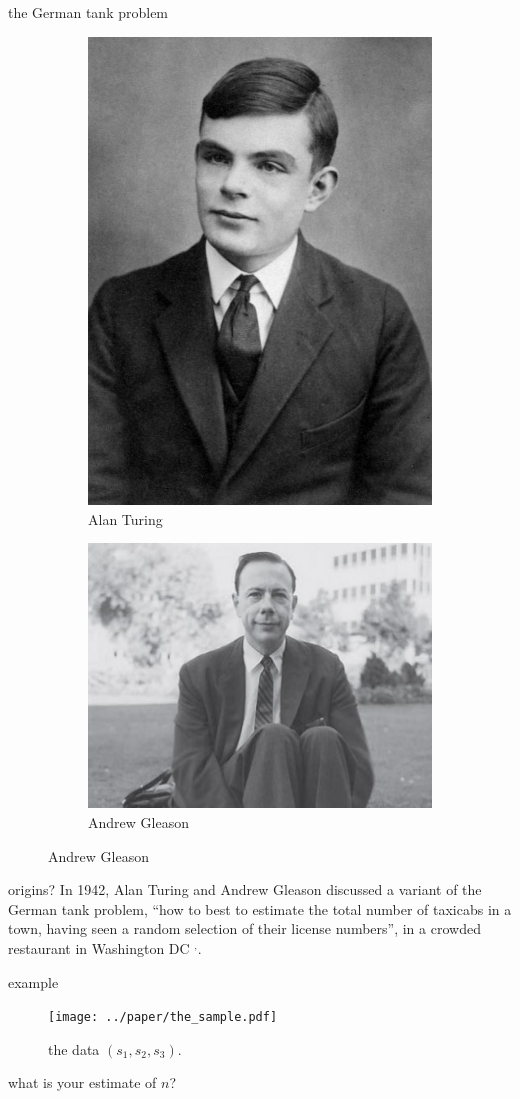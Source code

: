 \documentclass[10pt]{beamer}
\begin{document}
\begin{frame}[t]{the German tank problem}

\begin{figure}
	\centering
	\begin{subfigure}[b]{0.45\textwidth}
		\centering
		\includegraphics[height=0.5\textwidth]{turing.jpg} \caption{Alan Turing}
	\end{subfigure} 
	\begin{subfigure}[b]{0.45\textwidth}
		\centering
		\includegraphics[height=0.5\textwidth]{gleason.jpg}  \caption{Andrew Gleason}
	\end{subfigure} 
\end{figure}


\begin{exampleblock}{origins?}
In 1942, Alan Turing and Andrew Gleason discussed a variant of the German tank problem, ``how to best to estimate the total number of taxicabs in a town, having seen a random selection of their license numbers'', in a crowded restaurant in Washington DC $^,$. 
\end{exampleblock}
\end{frame}

\begin{frame}[t]{example}
\begin{figure}
	\centering
	\texttt{[image: ../paper/the\_sample.pdf]}
	\caption{the data $(s_1, s_2, s_3)$.}
\end{figure}

what is your estimate of $n$?
\end{frame}
\end{document}
